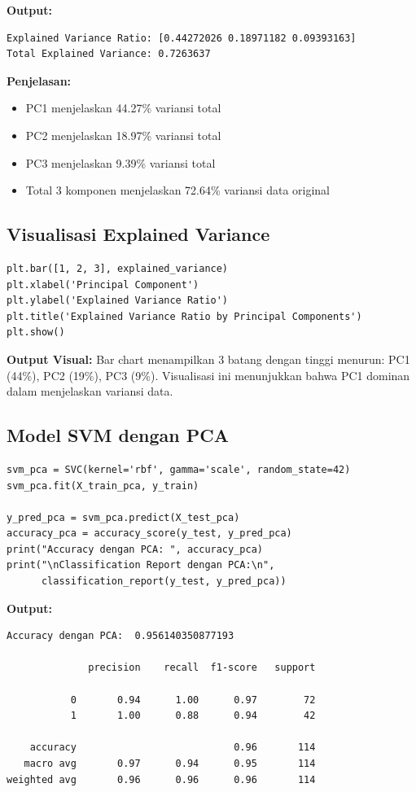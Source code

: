 \documentclass[12pt,a4paper]{article}
\begin{document}
\textbf{Output:}
\begin{verbatim}
Explained Variance Ratio: [0.44272026 0.18971182 0.09393163]
Total Explained Variance: 0.7263637
\end{verbatim}

\textbf{Penjelasan:} 
\begin{itemize}
    \item PC1 menjelaskan 44.27\% variansi total
    \item PC2 menjelaskan 18.97\% variansi total
    \item PC3 menjelaskan 9.39\% variansi total
    \item Total 3 komponen menjelaskan 72.64\% variansi data original
\end{itemize}

\subsection{Visualisasi Explained Variance}

\begin{lstlisting}[caption=Bar Chart Explained Variance]
plt.bar([1, 2, 3], explained_variance)
plt.xlabel('Principal Component')
plt.ylabel('Explained Variance Ratio')
plt.title('Explained Variance Ratio by Principal Components')
plt.show()
\end{lstlisting}

\textbf{Output Visual:} Bar chart menampilkan 3 batang dengan tinggi menurun: PC1 (44\%), PC2 (19\%), PC3 (9\%). Visualisasi ini menunjukkan bahwa PC1 dominan dalam menjelaskan variansi data.

\subsection{Model SVM dengan PCA}

\begin{lstlisting}[caption=Training SVM pada Data PCA]
svm_pca = SVC(kernel='rbf', gamma='scale', random_state=42)
svm_pca.fit(X_train_pca, y_train)

y_pred_pca = svm_pca.predict(X_test_pca)
accuracy_pca = accuracy_score(y_test, y_pred_pca)
print("Accuracy dengan PCA: ", accuracy_pca)
print("\nClassification Report dengan PCA:\n", 
      classification_report(y_test, y_pred_pca))
\end{lstlisting}

\textbf{Output:}
\begin{verbatim}
Accuracy dengan PCA:  0.956140350877193

              precision    recall  f1-score   support

           0       0.94      1.00      0.97        72
           1       1.00      0.88      0.94        42

    accuracy                           0.96       114
   macro avg       0.97      0.94      0.95       114
weighted avg       0.96      0.96      0.96       114
\end{verbatim}
\end{document}
